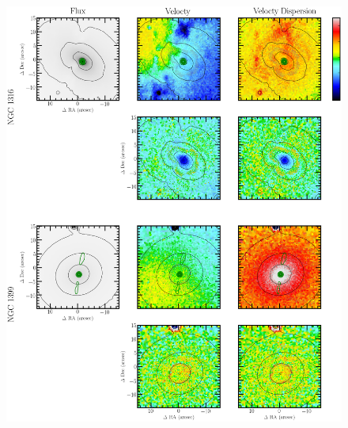 		\begin{figure}
			\centering
			\includegraphics[height=0.62\textheight]{chapter4/muse/kin2.png}
		\end{figure}



